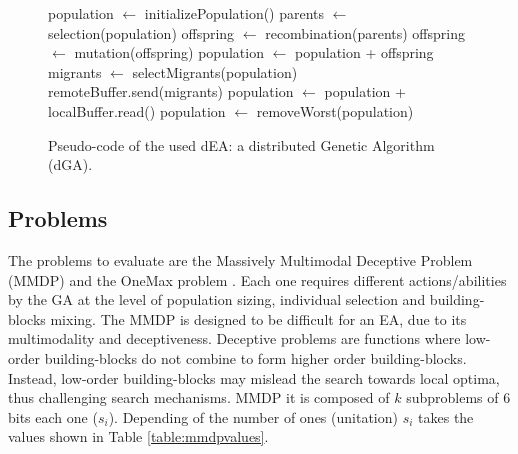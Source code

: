 \documentclass[final,1p,times]{elsarticle}
\begin{document}
\begin{figure}[htb]

\begin{algorithmic}
\STATE population $\gets$ initializePopulation()
    \STATE parents $\gets$ selection(population)
    \STATE offspring $\gets$ recombination(parents)
    \STATE offspring $\gets$ mutation(offspring)
    \STATE population $\gets$ population + offspring
      \STATE migrants $\gets$ selectMigrants(population)
      \STATE remoteBuffer.send(migrants)
    \ENDIF
      \STATE population $\gets$ population + localBuffer.read()
    \ENDIF
    \STATE population $\gets$ removeWorst(population)
\ENDWHILE

\end{algorithmic}
\caption{Pseudo-code of the used dEA: a distributed Genetic Algorithm (dGA).}
\label{fig:EA}
\end{figure}




\subsection{Problems}

The problems to evaluate are the Massively Multimodal Deceptive
Problem (MMDP) \cite{goldberg92massive} and the OneMax problem
\cite{ONEMAX}. Each one requires different actions/abilities by the GA
at the level of population sizing, individual selection and
building-blocks mixing. The MMDP
 is designed to be difficult for an EA, due to
its multimodality and deceptiveness. Deceptive problems are functions where low-order building-blocks do not combine to form higher order building-blocks. Instead, low-order building-blocks may mislead the search towards local optima, thus challenging search mechanisms. MMDP it is composed of $k$ subproblems of 6 bits each one ($s_i$). Depending of
the number of ones (unitation) $s_i$ takes the values shown in Table \ref{table:mmdpvalues}.  
\end{document}
